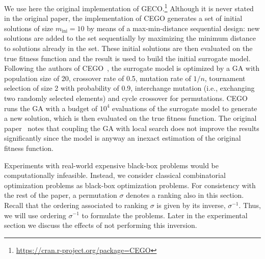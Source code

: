 \documentclass[sigconf,dvipsnames]{acmart}
\newcommand{\minit}{\ensuremath{m_\text{ini}}\xspace}
\newcommand{\FEmax}{\ensuremath{m}}
\begin{document}
We use here the original implementation of
GECO.\footnote{\url{https://cran.r-project.org/package=CEGO}} %
Although it is never stated in the original paper, the implementation of CEGO
generates a set of initial solutions of size $\minit=10$ by means of a
max-min-distance sequential design: new solutions are added to the set
sequentially by maximizing the minimum distance to solutions already in the
set. These initial solutions are then evaluated on the true fitness function
and the result is used to build the initial surrogate
model. %
Following the authors of
CEGO~\citep{ZaeStoFriFisNauBar2014,ZaeStoBar2014:ppsn}, the surrogate model is
optimized by a GA with population size of 20, crossover rate of 0.5, mutation
rate of $1/n$, tournament selection of size 2 with probability of 0.9,
interchange mutation (i.e., exchanging two randomly selected elements) and
cycle crossover for permutations. CEGO runs the GA with a budget of $10^4$
evaluations of the surrogate model to generate a new solution, which is then
evaluated on the true fitness function.  The original
paper~\citep[p.~875]{ZaeStoFriFisNauBar2014} notes that coupling the GA with
local search does not improve the results significantly since the model is
anyway an inexact estimation of the original fitness function.









%
Experiments with real-world expensive black-box problems would be computationally infeasible. Instead, we consider classical combinatorial optimization problems as black-box optimization problems. For consistency with the rest of the paper, a permutation $\sigma$ denotes a ranking also in this section. Recall that the ordering associated to ranking $\sigma$ is given by its inverse, $\sigma^{-1}$. Thus, we will use ordering $\sigma^{-1}$ to formulate the problems. Later in the experimental section we discuss the effects of not performing this inversion.
\end{document}
